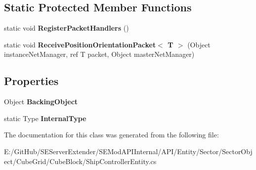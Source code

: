 \subsection*{Static Protected Member Functions}
\begin{DoxyCompactItemize}
\item 
\hypertarget{class_s_e_mod_a_p_i_internal_1_1_a_p_i_1_1_entity_1_1_sector_1_1_sector_object_1_1_cube_grid_1_10d30164bdccb131dcc67927f77b8ef67_ab58174353cb9847aead271e6d54d2e8e}{}static void {\bfseries Register\+Packet\+Handlers} ()\label{class_s_e_mod_a_p_i_internal_1_1_a_p_i_1_1_entity_1_1_sector_1_1_sector_object_1_1_cube_grid_1_10d30164bdccb131dcc67927f77b8ef67_ab58174353cb9847aead271e6d54d2e8e}

\item 
\hypertarget{class_s_e_mod_a_p_i_internal_1_1_a_p_i_1_1_entity_1_1_sector_1_1_sector_object_1_1_cube_grid_1_10d30164bdccb131dcc67927f77b8ef67_a7fd36f68cad13dc108dc044fd51bac2c}{}static void {\bfseries Receive\+Position\+Orientation\+Packet$<$ T $>$} (Object instance\+Net\+Manager, ref T packet, Object master\+Net\+Manager)\label{class_s_e_mod_a_p_i_internal_1_1_a_p_i_1_1_entity_1_1_sector_1_1_sector_object_1_1_cube_grid_1_10d30164bdccb131dcc67927f77b8ef67_a7fd36f68cad13dc108dc044fd51bac2c}

\end{DoxyCompactItemize}
\subsection*{Properties}
\begin{DoxyCompactItemize}
\item 
\hypertarget{class_s_e_mod_a_p_i_internal_1_1_a_p_i_1_1_entity_1_1_sector_1_1_sector_object_1_1_cube_grid_1_10d30164bdccb131dcc67927f77b8ef67_aeadf1c47aaa0aad7a6d6bcbca45f2f13}{}Object {\bfseries Backing\+Object}\label{class_s_e_mod_a_p_i_internal_1_1_a_p_i_1_1_entity_1_1_sector_1_1_sector_object_1_1_cube_grid_1_10d30164bdccb131dcc67927f77b8ef67_aeadf1c47aaa0aad7a6d6bcbca45f2f13}

\item 
\hypertarget{class_s_e_mod_a_p_i_internal_1_1_a_p_i_1_1_entity_1_1_sector_1_1_sector_object_1_1_cube_grid_1_10d30164bdccb131dcc67927f77b8ef67_a45a59335e20954090a51cbd4097ac60e}{}static Type {\bfseries Internal\+Type}\label{class_s_e_mod_a_p_i_internal_1_1_a_p_i_1_1_entity_1_1_sector_1_1_sector_object_1_1_cube_grid_1_10d30164bdccb131dcc67927f77b8ef67_a45a59335e20954090a51cbd4097ac60e}

\end{DoxyCompactItemize}


The documentation for this class was generated from the following file\+:\begin{DoxyCompactItemize}
\item 
E\+:/\+Git\+Hub/\+S\+E\+Server\+Extender/\+S\+E\+Mod\+A\+P\+I\+Internal/\+A\+P\+I/\+Entity/\+Sector/\+Sector\+Object/\+Cube\+Grid/\+Cube\+Block/Ship\+Controller\+Entity.\+cs\end{DoxyCompactItemize}
